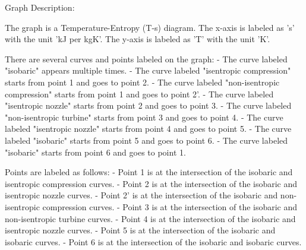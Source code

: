 Graph Description:

The graph is a Temperature-Entropy (T-s) diagram. The x-axis is labeled as 's' with the unit 'kJ per kgK'. The y-axis is labeled as 'T' with the unit 'K'.

There are several curves and points labeled on the graph:
- The curve labeled "isobaric" appears multiple times.
- The curve labeled "isentropic compression" starts from point 1 and goes to point 2.
- The curve labeled "non-isentropic compression" starts from point 1 and goes to point 2'.
- The curve labeled "isentropic nozzle" starts from point 2 and goes to point 3.
- The curve labeled "non-isentropic turbine" starts from point 3 and goes to point 4.
- The curve labeled "isentropic nozzle" starts from point 4 and goes to point 5.
- The curve labeled "isobaric" starts from point 5 and goes to point 6.
- The curve labeled "isobaric" starts from point 6 and goes to point 1.

Points are labeled as follows:
- Point 1 is at the intersection of the isobaric and isentropic compression curves.
- Point 2 is at the intersection of the isobaric and isentropic nozzle curves.
- Point 2' is at the intersection of the isobaric and non-isentropic compression curves.
- Point 3 is at the intersection of the isobaric and non-isentropic turbine curves.
- Point 4 is at the intersection of the isobaric and isentropic nozzle curves.
- Point 5 is at the intersection of the isobaric and isobaric curves.
- Point 6 is at the intersection of the isobaric and isobaric curves.